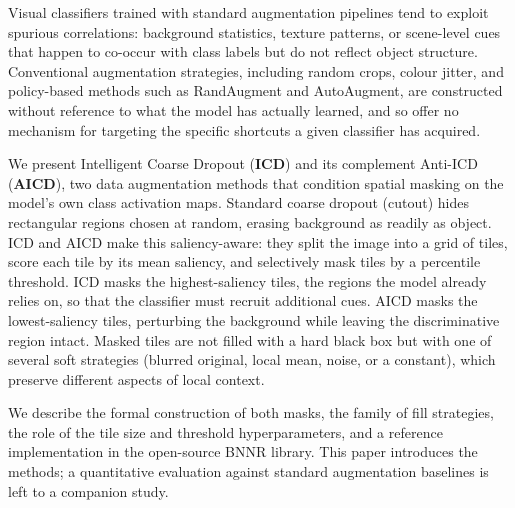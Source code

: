 Visual classifiers trained with standard augmentation pipelines tend to exploit
spurious correlations: background statistics, texture patterns, or scene-level
cues that happen to co-occur with class labels but do not reflect object
structure.  Conventional augmentation strategies, including random crops, colour
jitter, and policy-based methods such as RandAugment and AutoAugment, are
constructed without reference to what the model has actually learned, and so
offer no mechanism for targeting the specific shortcuts a given classifier has
acquired.

We present Intelligent Coarse Dropout (\textbf{ICD}) and its complement
Anti-ICD (\textbf{AICD}), two data augmentation methods that condition spatial
masking on the model's own class activation maps.  Standard coarse dropout
(cutout) hides rectangular regions chosen at random, erasing background as
readily as object.  ICD and AICD make this saliency-aware: they split the image
into a grid of tiles, score each tile by its mean saliency, and selectively
mask tiles by a percentile threshold.  ICD masks the highest-saliency
tiles, the regions the model already relies on, so that the classifier must
recruit additional cues.  AICD masks the lowest-saliency tiles, perturbing the
background while leaving the discriminative region intact.  Masked tiles are
not filled with a hard black box but with one of several soft strategies
(blurred original, local mean, noise, or a constant), which preserve different
aspects of local context.

We describe the formal construction of both masks, the family of fill
strategies, the role of the tile size and threshold hyperparameters, and a
reference implementation in the open-source BNNR library.  This paper
introduces the methods; a quantitative evaluation against standard augmentation
baselines is left to a companion study.
